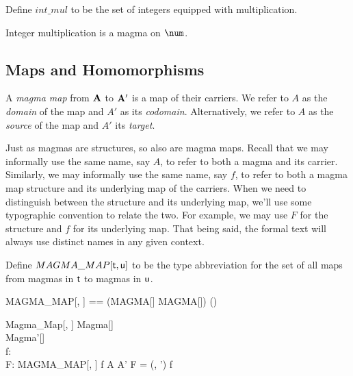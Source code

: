 \documentclass{amsart}
\begin{document}
\begin{example}

Define $int\_mul$ to be the set of integers equipped with multiplication.


Integer multiplication is a magma on $\num$.


\end{example}

\subsection{Maps and Homomorphisms}

A \textit{magma map} from $\mathbf{A}$ to $\mathbf{A}'$ is a map of their carriers.
We refer to $A$ as the \textit{domain} of the map and $A'$ as its \textit{codomain}.
Alternatively, we refer to $A$ as the \textit{source} of the map and $A'$ its \textit{target}.

Just as magmas are structures, so also are magma maps.
Recall that we may informally use the same name, say $A$, to refer to both a magma and its carrier.
Similarly, we may informally use the same name, say $f$, to refer to both a magma map
structure and its underlying map of the carriers.
When we need to distinguish between the structure and its underlying map,
we'll use some typographic convention to relate the two.
For example, we may use $F$ for the structure and $f$ for its underlying map.
That being said, the formal text will always use distinct names in any given context.

Define $MAGMA\_MAP[\mathsf{t}, \mathsf{u}]$ to be the type abbreviation for the set of
all maps from magmas in $\mathsf{t}$ to magmas in $\mathsf{u}$.

\begin{zed}
	MAGMA\_MAP[\genT, \genU] == (MAGMA[\genT] \cross MAGMA[\genU]) \cross (\genT \pfun \genU)
\end{zed}

\begin{schema}{Magma\_Map}[\genT, \genU]
	Magma[\genT] \\
	Magma'[\genU] \\
	f: \genT \pfun \genU \\
	F: MAGMA\_MAP[\genT, \genU]
\where
	f \in A \fun A'
\also
	F = (\strucA, \strucA') \mapsto f
\end{schema}
\end{document}
